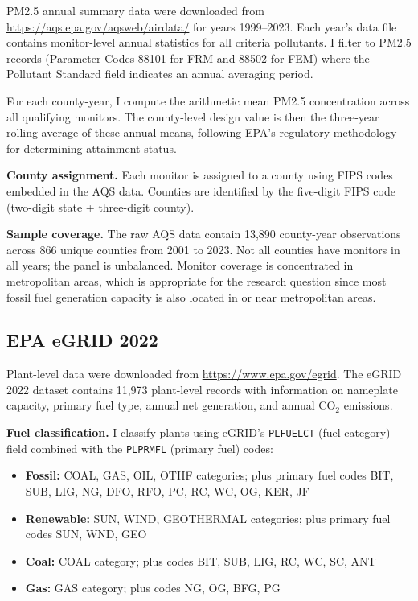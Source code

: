 \documentclass[12pt]{article}
\begin{document}
PM2.5 annual summary data were downloaded from \url{https://aqs.epa.gov/aqsweb/airdata/} for years 1999--2023. Each year's data file contains monitor-level annual statistics for all criteria pollutants. I filter to PM2.5 records (Parameter Codes 88101 for FRM and 88502 for FEM) where the Pollutant Standard field indicates an annual averaging period.

For each county-year, I compute the arithmetic mean PM2.5 concentration across all qualifying monitors. The county-level design value is then the three-year rolling average of these annual means, following EPA's regulatory methodology for determining attainment status.

\textbf{County assignment.} Each monitor is assigned to a county using FIPS codes embedded in the AQS data. Counties are identified by the five-digit FIPS code (two-digit state + three-digit county).

\textbf{Sample coverage.} The raw AQS data contain 13,890 county-year observations across 866 unique counties from 2001 to 2023. Not all counties have monitors in all years; the panel is unbalanced. Monitor coverage is concentrated in metropolitan areas, which is appropriate for the research question since most fossil fuel generation capacity is also located in or near metropolitan areas.

\subsection{EPA eGRID 2022}

Plant-level data were downloaded from \url{https://www.epa.gov/egrid}. The eGRID 2022 dataset contains 11,973 plant-level records with information on nameplate capacity, primary fuel type, annual net generation, and annual CO$_2$ emissions.

\textbf{Fuel classification.} I classify plants using eGRID's \texttt{PLFUELCT} (fuel category) field combined with the \texttt{PLPRMFL} (primary fuel) codes:
\begin{itemize}
    \item \textbf{Fossil:} COAL, GAS, OIL, OTHF categories; plus primary fuel codes BIT, SUB, LIG, NG, DFO, RFO, PC, RC, WC, OG, KER, JF
    \item \textbf{Renewable:} SUN, WIND, GEOTHERMAL categories; plus primary fuel codes SUN, WND, GEO
    \item \textbf{Coal:} COAL category; plus codes BIT, SUB, LIG, RC, WC, SC, ANT
    \item \textbf{Gas:} GAS category; plus codes NG, OG, BFG, PG
\end{itemize}
\end{document}
